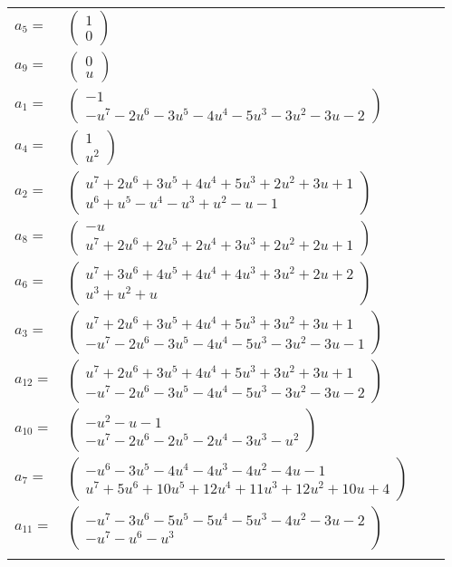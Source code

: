 \documentclass[1p]{elsarticle_modified}
\theoremstyle{definition}
\begin{document}
\begin{tabular}{m{7pt} m{180pt} m{7pt} m{180pt} }
\flushright $a_{5}=$&$\begin{pmatrix}1\\0\end{pmatrix}$ \\
\flushright $a_{9}=$&$\begin{pmatrix}0\\u\end{pmatrix}$ \\
\flushright $a_{1}=$&$\begin{pmatrix}-1\\- u^7-2 u^6-3 u^5-4 u^4-5 u^3-3 u^2-3 u-2\end{pmatrix}$ \\
\flushright $a_{4}=$&$\begin{pmatrix}1\\u^2\end{pmatrix}$ \\
\flushright $a_{2}=$&$\begin{pmatrix}u^7+2 u^6+3 u^5+4 u^4+5 u^3+2 u^2+3 u+1\\u^6+u^5- u^4- u^3+u^2- u-1\end{pmatrix}$ \\
\flushright $a_{8}=$&$\begin{pmatrix}- u\\u^7+2 u^6+2 u^5+2 u^4+3 u^3+2 u^2+2 u+1\end{pmatrix}$ \\
\flushright $a_{6}=$&$\begin{pmatrix}u^7+3 u^6+4 u^5+4 u^4+4 u^3+3 u^2+2 u+2\\u^3+u^2+u\end{pmatrix}$ \\
\flushright $a_{3}=$&$\begin{pmatrix}u^7+2 u^6+3 u^5+4 u^4+5 u^3+3 u^2+3 u+1\\- u^7-2 u^6-3 u^5-4 u^4-5 u^3-3 u^2-3 u-1\end{pmatrix}$ \\
\flushright $a_{12}=$&$\begin{pmatrix}u^7+2 u^6+3 u^5+4 u^4+5 u^3+3 u^2+3 u+1\\- u^7-2 u^6-3 u^5-4 u^4-5 u^3-3 u^2-3 u-2\end{pmatrix}$ \\
\flushright $a_{10}=$&$\begin{pmatrix}- u^2- u-1\\- u^7-2 u^6-2 u^5-2 u^4-3 u^3- u^2\end{pmatrix}$ \\
\flushright $a_{7}=$&$\begin{pmatrix}- u^6-3 u^5-4 u^4-4 u^3-4 u^2-4 u-1\\u^7+5 u^6+10 u^5+12 u^4+11 u^3+12 u^2+10 u+4\end{pmatrix}$ \\
\flushright $a_{11}=$&$\begin{pmatrix}- u^7-3 u^6-5 u^5-5 u^4-5 u^3-4 u^2-3 u-2\\- u^7- u^6- u^3\end{pmatrix}$\\&\end{tabular}
\end{document}
